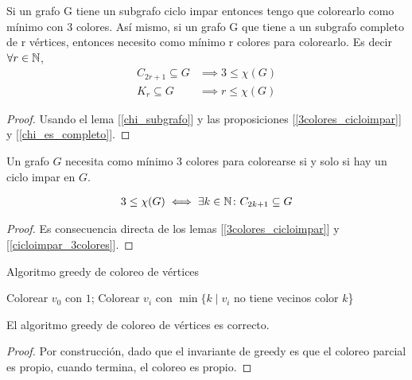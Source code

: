 \begin{lemma}\label{cicloimpar_3colores}
  Si un grafo G tiene un subgrafo ciclo impar entonces tengo que colorearlo como mínimo con 3 colores.
  Así mismo, si un grafo G que tiene a un subgrafo completo de r vértices, entonces necesito como mínimo r colores para colorearlo. Es decir $\forall r \in \mathbb{N}$,
  \begin{align}
    C_{2r+1} \subseteq G &\implies 3 \le \chi(G)\\
    K_r \subseteq G      &\implies r \le \chi(G)
  \end{align}
\end{lemma}
\begin{proof}
  Usando el lema [\ref{chi_subgrafo}] y las proposiciones [\ref{3colores_cicloimpar}] y [\ref{chi_es_completo}].
\end{proof}

\begin{proposition}
  Un grafo $G$ necesita como mínimo 3 colores para colorearse si y solo si hay un ciclo impar en $G$.
  
  \begin{align}
    3 \le \chi(G) \iff \exists k \in \mathbb{N} \colon C_{2k+1} \subseteq G
  \end{align}
\end{proposition}

\begin{proof}
  Es consecuencia directa de los lemas [\ref{3colores_cicloimpar}] y [\ref{cicloimpar_3colores}].
\end{proof}


\begin{algorithm}
  \caption{Algoritmo greedy de coloreo de vértices}
  \begin{algorithmic}
    \State Colorear $v_0$ con $1$;
    \State Colorear $v_i$ con $\min \{k \mid v_i $ no tiene vecinos color $k$\}
    \EndFor
    \EndFunction
  \end{algorithmic}
\end{algorithm}

\begin{proposition}
  El algoritmo greedy de coloreo de vértices es correcto.
\end{proposition}
\begin{proof}
  Por construcción, dado que el invariante de greedy es que el coloreo parcial es propio, cuando termina, el coloreo es propio.
\end{proof}

